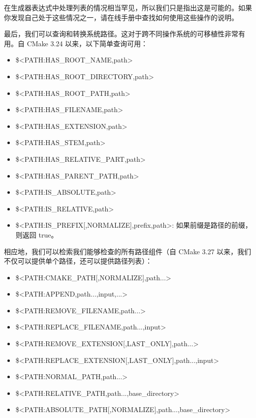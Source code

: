 在生成器表达式中处理列表的情况相当罕见，所以我们只是指出这是可能的。如果你发现自己处于这些情况之一，请在线手册中查找如何使用这些操作的说明。

最后，我们可以查询和转换系统路径。这对于跨不同操作系统的可移植性非常有用。自 CMake 3.24 以来，以下简单查询可用：

\begin{itemize}
\item
\$<PATH:HAS\_ROOT\_NAME,path>

\item
\$<PATH:HAS\_ROOT\_DIRECTORY,path>

\item
\$<PATH:HAS\_ROOT\_PATH,path>

\item
\$<PATH:HAS\_FILENAME,path>

\item
\$<PATH:HAS\_EXTENSION,path>

\item
\$<PATH:HAS\_STEM,path>

\item
\$<PATH:HAS\_RELATIVE\_PART,path>

\item
\$<PATH:HAS\_PARENT\_PATH,path>

\item
\$<PATH:IS\_ABSOLUTE,path>

\item
\$<PATH:IS\_RELATIVE,path>

\item
\$<PATH:IS\_PREFIX[,NORMALIZE],prefix,path>: 如果前缀是路径的前缀，则返回 true。
\end{itemize}

相应地，我们可以检索我们能够检查的所有路径组件（自 CMake 3.27 以来，我们不仅可以提供单个路径，还可以提供路径列表）：

\begin{itemize}
\item
\$<PATH:CMAKE\_PATH[,NORMALIZE],path...>

\item
\$<PATH:APPEND,path...,input,...>

\item
\$<PATH:REMOVE\_FILENAME,path...>

\item
\$<PATH:REPLACE\_FILENAME,path...,input>

\item
\$<PATH:REMOVE\_EXTENSION[,LAST\_ONLY],path...>

\item
\$<PATH:REPLACE\_EXTENSION[,LAST\_ONLY],path...,input>

\item
\$<PATH:NORMAL\_PATH,path...>

\item
\$<PATH:RELATIVE\_PATH,path...,base\_directory>

\item
\$<PATH:ABSOLUTE\_PATH[,NORMALIZE],path...,base\_directory>
\end{itemize}

